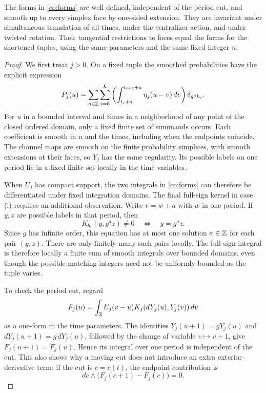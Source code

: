 \begin{lemma}
\label{co:regularity}
The forms in \eqref{co:forms} are well defined, independent of the period
cut, and smooth up to every simplex face by one-sided extension.  They
are invariant under simultaneous translation of all times, under the
centralizer action, and under twisted rotation.  Their tangential
restrictions to faces equal the forms for the shortened tuples, using the
same parameters and the same fixed integer $n$.
\end{lemma}

\begin{proof}
We first treat $j>0$.  On a fixed tuple the smoothed probabilities have
the explicit expression
\begin{equation}
 P_j(u)=\sum_{a\in\mathbb Z}\sum_{i=0}^k
 \left(\int_{t_i+a}^{t_{i+1}+a}\eta_j(u-v)\,dv\right)\delta_{g^ah_i}.
 \label{co:smooth-intervals}
\end{equation}
For $u$ in a bounded interval and times in a neighborhood of any point of
the closed ordered domain, only a fixed finite set of summands occurs.
Each coefficient is smooth in $u$ and the times, including when the
endpoints coincide.  The channel maps are smooth on the finite
probability simplices, with smooth extensions at their faces, so $Y_j$
has the same regularity.  Its possible labels on one period lie in a
fixed finite set locally in the time variables.

When $U_j$ has compact support, the two integrals in
\eqref{co:forms} can therefore be differentiated under fixed integration
domains.  The final full-sign kernel in case (i) requires an additional
observation.  Write $v=w+a$ with $w$ in one period.  If $y,z$ are possible
labels in that period, then
\[
 K_{b_*}(y,g^az)\ne0\quad\Longleftrightarrow\quad y=g^az.
\]
Since $g$ has infinite order, this equation has at most one solution
$a\in\mathbb Z$ for each pair $(y,z)$.  There are only finitely many such pairs
locally.  The full-sign integral is therefore locally a finite sum of
smooth integrals over bounded domains, even though the possible matching
integers need not be uniformly bounded as the tuple varies.

To check the period cut, regard
\[
 F_j(u)=\int_{\mathbb R}U_j(v-u)K_j(dY_j(u),Y_j(v))\,dv
\]
as a one-form in the time parameters.  The identities
$Y_j(u+1)=gY_j(u)$ and $dY_j(u+1)=g\,dY_j(u)$, followed by the change of
variable $v\mapsto v+1$, give $F_j(u+1)=F_j(u)$.  Hence its integral over
one period is independent of the cut.  This also shows why a moving cut
does not introduce an extra exterior-derivative term: if the cut is
$c=c(t)$, the endpoint contribution is
\begin{equation}
 dc\wedge\bigl(F_j(c+1)-F_j(c)\bigr)=0.
 \label{co:cut-cancellation}
\end{equation}


\end{proof}

